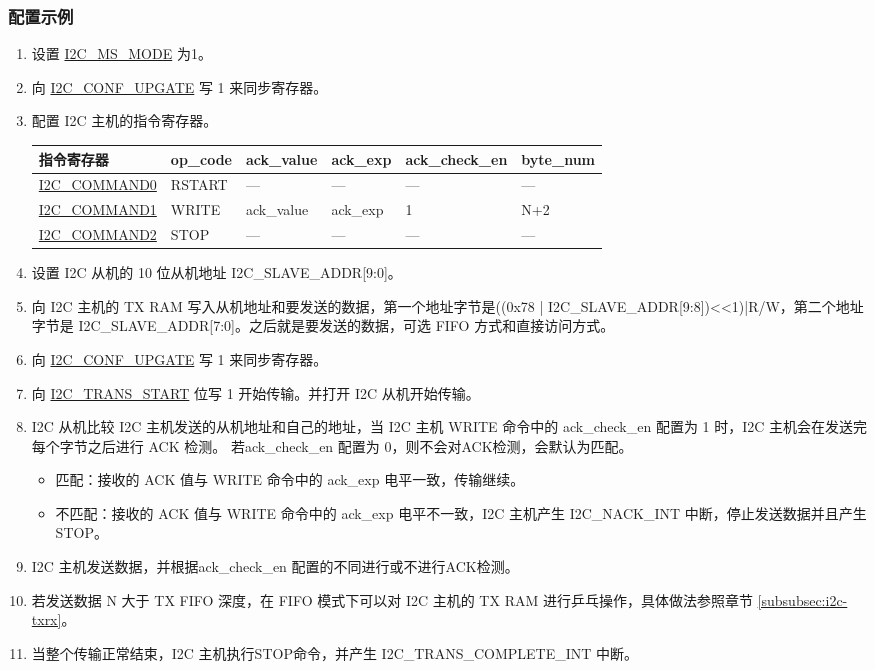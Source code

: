 \documentclass[main\_\_CN.tex]{subfiles}
\begin{document}
\subsubsection{配置示例}
\begin{enumerate}

\item 设置 \hyperref[fielddesc:I2CMSMODE]{I2C\_MS\_MODE} 为1。
\item 向 \hyperref[fielddesc:I2CCONFUPGATE]{I2C\_CONF\_UPGATE} 写 1 来同步寄存器。
\item 配置 I2C 主机的指令寄存器。

\begin{longtable}{ | p{4cm} | p{2cm} | p{2cm} | p{2cm} |p{2cm} | p{2cm} |}
\hline\rowcolor{lightgray}
指令寄存器& op\_code & ack\_value&ack\_exp&ack\_check\_en&byte\_num  \\ \hline
\hyperref[fielddesc:I2CCOMMAND0]{I2C\_COMMAND0} & RSTART& ---&---&---&---  \\ \hline
\hyperref[fielddesc:I2CCOMMAND1]{I2C\_COMMAND1} & WRITE& ack\_value&ack\_exp&1&N+2  \\ \hline
\hyperref[fielddesc:I2CCOMMAND2]{I2C\_COMMAND2} & STOP& ---&---&---&---  \\ \hline
\end{longtable}

\item 设置 I2C 从机的 10 位从机地址 I2C\_SLAVE\_ADDR[9:0]。
\item 向 I2C 主机的 TX RAM 写入从机地址和要发送的数据，第一个地址字节是((0x78 | I2C\_SLAVE\_ADDR[9:8])<<1)|R/W，第二个地址字节是 I2C\_SLAVE\_ADDR[7:0]。之后就是要发送的数据，可选 FIFO 方式和直接访问方式。
\item 向 \hyperref[fielddesc:I2CCONFUPGATE]{I2C\_CONF\_UPGATE} 写 1 来同步寄存器。
\item 向 \hyperref[fielddesc:I2CTRANSSTART]{I2C\_TRANS\_START} 位写 1 开始传输。并打开 I2C 从机开始传输。
\item I2C 从机比较 I2C 主机发送的从机地址和自己的地址，当 I2C 主机 WRITE 命令中的 ack\_check\_en 配置为 1 时，I2C 主机会在发送完每个字节之后进行 ACK 检测。 若ack\_check\_en 配置为 0，则不会对ACK检测，会默认为匹配。
\begin{itemize}
\item 匹配：接收的 ACK 值与 WRITE 命令中的 ack\_exp 电平一致，传输继续。
\item 不匹配：接收的 ACK 值与 WRITE 命令中的 ack\_exp 电平不一致，I2C 主机产生 I2C\_NACK\_INT 中断，停止发送数据并且产生 STOP。
\end{itemize}

\item I2C 主机发送数据，并根据ack\_check\_en 配置的不同进行或不进行ACK检测。

\item 若发送数据 N 大于 TX FIFO 深度，在 FIFO 模式下可以对 I2C 主机的 TX RAM 进行乒乓操作，具体做法参照章节 \ref{subsubsec:i2c-txrx}。

\item 当整个传输正常结束，I2C 主机执行STOP命令，并产生 I2C\_TRANS\_COMPLETE\_INT 中断。

\end{enumerate}
\end{document}
